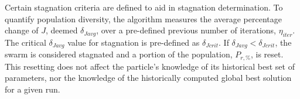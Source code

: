 \noindent Certain stagnation criteria are defined to aid in stagnation determination. To quantify population diversity, the algorithm measures the average
percentage change of $J$, deemed $\delta_{Javg}$, over a pre-defined previous number of iterations, $\eta_{iter}$. The critical 
$\delta_{Javg}$ value for stagnation is pre-defined as $\delta_{Jcrit}$.  If $\delta_{Javg} < \delta_{Jcrit}$, the swarm is considered
stagnated and a portion of the population, $P_{r,\text{\%}}$, is reset. This resetting does not affect the particle's knowledge of its
historical best set of parameters, nor the knowledge of the historically computed global best solution for a given run.\newline

\newpage
